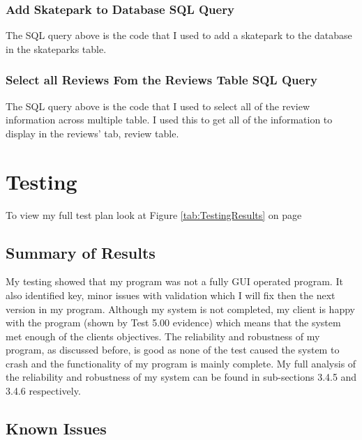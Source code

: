 \begin{landscape}
\subsubsection{Add Skatepark to Database SQL Query}

The SQL query above is the code that I used to add a skatepark to the database in the skateparks table. 



\subsubsection{Select all Reviews Fom the Reviews Table SQL Query}

The SQL query above is the code that I used to select all of the review information across multiple table. I used this to get all of the information to display in the reviews' tab, review table. 

\end{landscape}

\section {Testing}

To view my full test plan look at Figure \ref{tab:TestingResults} on page \pageref{tab:TestingResults}

\subsection{Summary of Results}

My testing showed that my program was not a fully GUI operated program. It also identified key, minor issues with validation which I will fix then the next version in my program. Although my system is not completed, my client is happy with the program (shown by Test 5.00 evidence) which means that the system met enough of the clients objectives. The reliability and robustness of my program, as discussed before, is good as none of the test caused the system to crash and the functionality of my program is mainly complete. My full analysis of the reliability and robustness of my system can be found in sub-sections 3.4.5 and 3.4.6 respectively.

\subsection{Known Issues}


